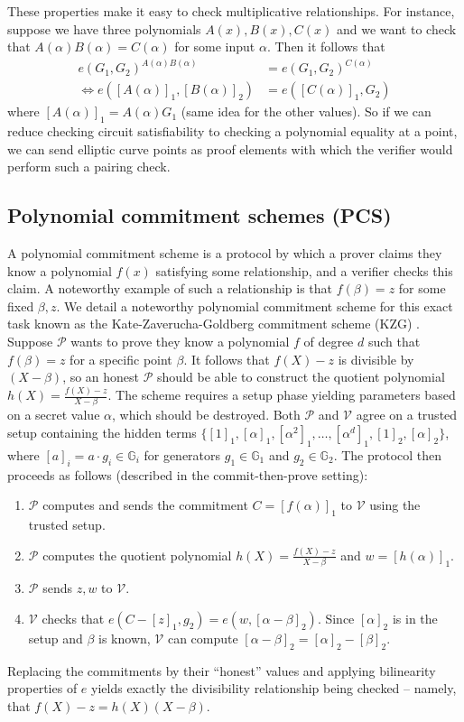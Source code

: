 These properties make it easy to check multiplicative relationships. For instance, suppose we have three polynomials $A(x), B(x), C(x)$ and we want to check that $A(\alpha)B(\alpha) = C(\alpha)$ for some input $\alpha$. Then it follows that 
\begin{align*}
e(G_1, G_2)^{A(\alpha)B(\alpha)} &= e(G_1, G_2)^{C(\alpha)} \\
\Leftrightarrow e([A(\alpha)]_1, [B(\alpha)]_2) &= e([C(\alpha)]_1, G_2)
\end{align*}
where $[A(\alpha)]_1 = A(\alpha)G_1$ (same idea for the other values). So if we can reduce checking circuit satisfiability to checking a polynomial equality at a point, we can send elliptic curve points as proof elements with which the verifier would perform such a pairing check. 

\subsection{Polynomial commitment schemes (PCS)}\label{subsec:pcs}
\noindent A polynomial commitment scheme is a protocol by which a prover claims they know a polynomial $f(x)$ satisfying some relationship, and a verifier checks this claim. A noteworthy example of such a relationship is that $f(\beta) = z$ for some fixed $\beta, z$. We detail a noteworthy polynomial commitment scheme for this exact task known as the Kate-Zaverucha-Goldberg commitment scheme (KZG) \cite{kzg}. Suppose $\mathcal{P}$ wants to prove they know a polynomial $f$ of degree $d$ such that $f(\beta) = z$ for a specific point $\beta$. It follows that $f(X) - z$ is divisible by $(X - \beta)$, so an honest $\mathcal{P}$ should be able to construct the quotient polynomial $h(X) = \frac{f(X) - z}{X - \beta}$. The scheme requires a setup phase yielding parameters based on a secret value $\alpha$, which should be destroyed. Both $\mathcal{P}$ and $\mathcal{V}$ agree on a trusted setup containing the hidden terms $\{[1]_1, [\alpha]_1, [\alpha^2]_1, \dots, [\alpha^d]_1, [1]_2, [\alpha]_2\}$, where $[a]_i = a \cdot g_i \in \mathbb{G}_i$ for generators $g_1 \in \mathbb{G}_1$ and $g_2 \in \mathbb{G}_2$. The protocol then proceeds as follows (described in the commit-then-prove setting):
\begin{enumerate}
    \item $\mathcal{P}$ computes and sends the commitment $C = [f(\alpha)]_1$ to $\mathcal{V}$ using the trusted setup.
    \item $\mathcal{P}$ computes the quotient polynomial $h(X) = \frac{f(X) - z}{X - \beta}$ and $w = [h(\alpha)]_1$.
    \item $\mathcal{P}$ sends $z, w$ to $\mathcal{V}$.
    \item $\mathcal{V}$ checks that $e(C - [z]_1, g_2) = e(w, [\alpha - \beta]_2)$. Since $[\alpha]_2$ is in the setup and $\beta$ is known, $\mathcal{V}$ can compute $[\alpha - \beta]_2 = [\alpha]_2 - [\beta]_2$.
\end{enumerate}
\noindent Replacing the commitments by their ``honest'' values and applying bilinearity properties of $e$ yields exactly the divisibility relationship being checked -- namely, that $f(X) - z = h(X)(X - \beta)$.\\

